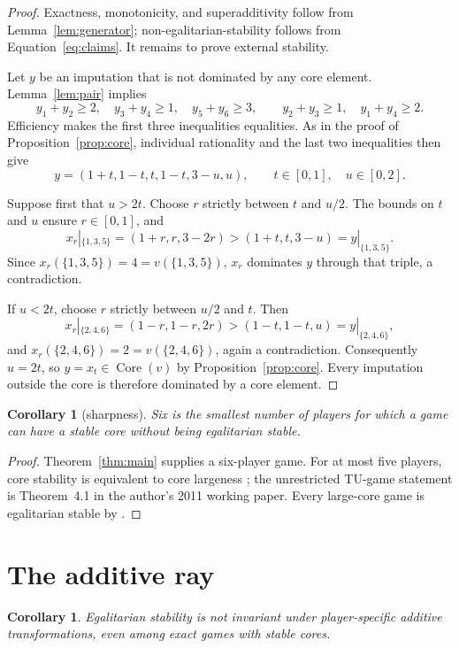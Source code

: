 \documentclass[11pt]{article}
\newtheorem{corollary}[theorem]{Corollary}
\newcommand{\core}{\operatorname{Core}}
\begin{document}
\begin{proof}
Exactness, monotonicity, and superadditivity follow from
Lemma~\ref{lem:generator}; non-egalitarian-stability follows from
Equation~\eqref{eq:claims}. It remains to prove external stability.

Let $y$ be an imputation that is not dominated by any core element.
Lemma~\ref{lem:pair} implies
\[
 y_1+y_2\ge2,\quad
 y_3+y_4\ge1,\quad
 y_5+y_6\ge3,
\qquad
 y_2+y_3\ge1,\quad
 y_1+y_4\ge2.
\]
Efficiency makes the first three inequalities equalities. As in the proof of
Proposition~\ref{prop:core}, individual rationality and the last two
inequalities then give
\[
 y=(1+t,1-t,t,1-t,3-u,u),
 \qquad t\in[0,1],\quad u\in[0,2].
\]

Suppose first that $u>2t$. Choose $r$ strictly between $t$ and $u/2$.
The bounds on $t$ and $u$ ensure $r\in[0,1]$, and
\[
 x_r|_{\{1,3,5\}}=(1+r,r,3-2r)
   >(1+t,t,3-u)=y|_{\{1,3,5\}}.
\]
Since $x_r(\{1,3,5\})=4=v(\{1,3,5\})$, $x_r$ dominates $y$ through that
triple, a contradiction.

If $u<2t$, choose $r$ strictly between $u/2$ and $t$. Then
\[
 x_r|_{\{2,4,6\}}=(1-r,1-r,2r)
   >(1-t,1-t,u)=y|_{\{2,4,6\}},
\]
and $x_r(\{2,4,6\})=2=v(\{2,4,6\})$, again a contradiction. Consequently
$u=2t$, so $y=x_t\in\core(v)$ by Proposition~\ref{prop:core}. Every
imputation outside the core is therefore dominated by a core element.
\end{proof}

\begin{corollary}[sharpness]\label{cor:sharp}
Six is the smallest number of players for which a game can have a stable core
without being egalitarian stable.
\end{corollary}

\begin{proof}
Theorem~\ref{thm:main} supplies a six-player game. For at most five players,
core stability is equivalent to core largeness \citep{Estevez2012}; the
unrestricted TU-game statement is Theorem~4.1 in the author's 2011 working
paper. Every large-core game is egalitarian stable by
\citet[Theorem~3.5]{Dietzenbacher2021}.
\end{proof}

\section{The additive ray}\label{sec:ray}

\begin{corollary}\label{cor:noncovariance}
Egalitarian stability is not invariant under player-specific additive
transformations, even among exact games with stable cores.
\end{corollary}
\end{document}
